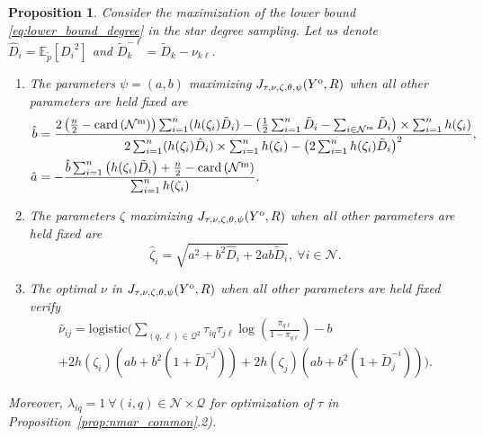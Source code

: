 \documentclass[10pt]{article}
\newcommand{\1}{\mathds{1}}
\newcommand{\MA}{Y}
\newcommand{\MAO}{\MA^\text{\rm o}}
\newcommand{\card}[1]{\text{\rm card}\left(#1\right)}
\newcommand{\block}{\mathcal{Q}}
\newcommand{\node}{\mathcal{N}}
\newcommand{\nodeM}{\node^\text{\rm m}}
\newcommand{\Ebb}{\mathbb{E}}
\newtheorem{proposition}{Proposition}
\begin{document}
\begin{proposition}\label{prop:nmar_degree}
  Consider     the     maximization     of     the     lower     bound
  \eqref{eq:lower_bound_degree} in the star degree sampling. 
  Let us denote $\hat{D}_i =\Ebb_{\tilde{p}}\left[ {D_i}^2 \right]$ and $\tilde{D}_{k}^{-\ell} = \tilde{D}_k - \nu_{k\ell}$.
  \begin{enumerate}
  \item The parameters $\psi = (a,b)$ maximizing $J_{\tau,\nu,\zeta,\theta,\psi}(\MAO,R)$  when  all  other parameters  are  held
    fixed are
    \begin{align}\nonumber
      \hat{b} &= \frac{  2\left(\frac{n}{2}-\card{\nodeM} \right)\sum_{i=1}^n (h(\zeta_i) \tilde{D}_i)  -
                  \left(\frac{1}{2}\sum_{i=1}^n \tilde{D}_i-\sum_{i\in\nodeM} \tilde{D}_i \right)
                \times    \sum_{i=1}^n   h(\zeta_i)}{    2\sum_{i=1}^n(
                h(\zeta_i) \hat{D}_i) \times  \sum_{i=1}^n h(\zeta_i)
                - {\left( 2\sum_{i=1}^n h(\zeta_i) \tilde{D}_i \right)}^2  }, \\
      \hat{a} &= -\frac{ \hat{b} \sum_{i=1}^n \left(h(\zeta_i)\tilde{D}_i \right) + \frac{n}{2}- \card{\nodeM}}{ \sum_{i=1}^n h(\zeta_i) }.
    \end{align}
  \item The parameters $\zeta$ maximizing $J_{\tau,\nu,\zeta,\theta,\psi}(\MAO,R)$  when  all  other parameters  are  held
    fixed are
    \begin{equation}\nonumber
      \hat{\zeta}_{i} = \sqrt{a^2 + b^2\hat{D}_i + 2ab\tilde{D}_i}, \ \forall i \in \mathcal{N}.
    \end{equation}
  \item The optimal  $\nu$ in $J_{\tau,\nu,\zeta,\theta,\psi}(\MAO,R)$
    when all other parameters are held fixed verify
    \begin{multline}
      \hat{\nu}_{ij}
      = \mathrm{logistic} \Bigg( \sum_{(q,\ell)\in\block^2} \tau_{iq}\tau_{j\ell} \log\left(\frac{\pi_{q\ell}}{1-\pi_{q\ell}}\right)
      - b \\
      + 2h(\zeta_i)\left( ab + b^2(1+\tilde{D}_{i}^{-j}) \right) + 2h(\zeta_j)\left( ab + b^2(1+\tilde{D}_{j}^{-i}) \right) \Bigg).
    \end{multline}
  \end{enumerate}
  Moreover, $\lambda_{iq} = 1 \ \forall (i,q) \in \node\times\block$
  for optimization of $\tau$ in Proposition~\ref{prop:nmar_common}.2).
\end{proposition}
\end{document}
